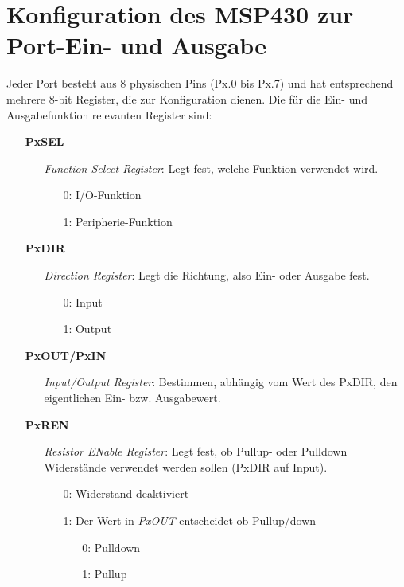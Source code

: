 \documentclass[a4paper, 12pt]{article}
\begin{document}
  
  \clearpage
  \setcounter{page}{1}

\section{Konfiguration des MSP430 zur Port-Ein- und Ausgabe}
Jeder Port besteht aus 8 physischen Pins (Px.0 bis Px.7) und hat entsprechend mehrere 8-bit Register, die zur
Konfiguration dienen. Die für die Ein- und Ausgabefunktion relevanten Register
sind:
\begin{enumerate}
\item[] \textbf{PxSEL}
  \begin{enumerate}
    \item[] \textit{Function Select Register}: Legt fest, welche Funktion verwendet wird.
      \begin{enumerate}
        \item[0:]  I/O-Funktion
        \item[1:]  Peripherie-Funktion
      \end{enumerate}
  \end{enumerate}
\item[] \textbf{PxDIR}
  \begin{enumerate}
  \item[] \textit{Direction Register}: Legt die Richtung, also Ein- oder Ausgabe fest.
  \begin{enumerate}
    \item[0:]  Input
    \item[1:]  Output
  \end{enumerate}
  \end{enumerate}
\item[] \textbf{PxOUT/PxIN}
  \begin{enumerate}
\item[]    \textit{Input/Output Register}: Bestimmen, abhängig vom Wert des PxDIR, den
   eigentlichen Ein- bzw. Ausgabewert.
 \end{enumerate}
\item[] \textbf{PxREN}
  \begin{enumerate}
    \item[] \emph{Resistor ENable Register}: Legt fest, ob Pullup- oder Pulldown
      Widerstände verwendet werden sollen (PxDIR auf Input).
      \begin{enumerate}
        \item[0:] Widerstand deaktiviert
        \item[1:] Der Wert in \emph{PxOUT} entscheidet ob Pullup/down
          \begin{enumerate}
            \item[0:] Pulldown
            \item[1:] Pullup
          \end{enumerate}
      \end{enumerate}
  \end{enumerate}
\end{enumerate}
\end{document}
